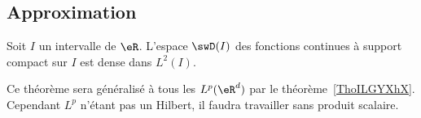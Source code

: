 
\subsection{Approximation}

\begin{theorem}       \label{ThoJsBKir}
	Soit \( I\) un intervalle de \( \eR\). L'espace \( \swD(I)\) des fonctions continues à support compact sur \( I\) est dense dans \( L^2(I)\).
\end{theorem}
Ce théorème sera généralisé à tous les \( L^p(\eR^d)\) par le théorème~\ref{ThoILGYXhX}. Cependant \( L^p\) n'étant pas un Hilbert, il faudra travailler sans produit scalaire.

